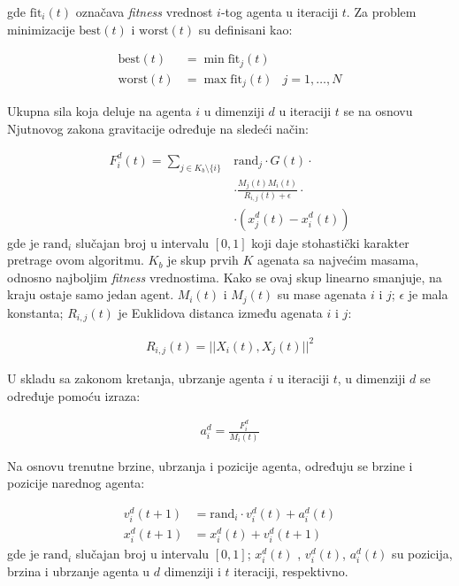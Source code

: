 gde $\mathrm{fit}_i(t)$ označava \emph{fitness} vrednost $i$-tog agenta u iteraciji $t$. Za problem minimizacije $\mathrm{best}(t)$  i $\mathrm{worst}(t)$ su definisani kao:

\begin{align}
    \mathrm{best}(t) & = \min \mathrm{fit}_j(t) & \\
    \mathrm{worst}(t) & = \max \mathrm{fit}_j(t) & j = 1, \dots, N \nonumber
\end{align}

Ukupna sila koja deluje na agenta $i$ u dimenziji $d$ u iteraciji $t$ se na osnovu Njutnovog zakona gravitacije određuje na sledeći način:

\begin{align}
    F_i^d(t) =  \sum_{j \in K_{b} \setminus \{i\}}
    & \mathrm{rand}_j \cdot G(t) \cdot \nonumber \\
    & \cdot \frac{M_j(t) M_i(t)}{R_{i,j}(t) + \epsilon} \cdot \nonumber \\
    & \cdot \left( x_j^d(t) - x_i^d(t) \right)
\end{align}
gde je $\mathrm{rand}_i$ slučajan broj u intervalu $[0,1]$ koji daje stohastički karakter pretrage ovom algoritmu. $K_{b}$ je skup prvih $K$ agenata sa najvećim masama, odnosno najboljim \emph{fitness} vrednostima. Kako se ovaj skup linearno smanjuje, na kraju ostaje samo jedan agent. $M_i(t)$ i $M_j(t)$ su mase agenata $i$ i $j$; $\epsilon$ je mala konstanta; $R_{i,j}(t)$ je Euklidova distanca između agenata $i$ i $j$:

\begin{align*}
    R_{i,j}(t) = ||X_i(t), X_j(t)||^2
\end{align*}

U skladu sa zakonom kretanja, ubrzanje agenta $i$ u iteraciji $t$, u dimenziji $d$ se određuje pomoću izraza:

\begin{align}
    a_i^d = \frac{F_i^d}{M_i(t)}
\end{align}

Na osnovu trenutne brzine, ubrzanja i pozicije agenta, određuju se brzine i pozicije  narednog agenta:

\begin{align}
    v_i^d(t+1) & = \mathrm{rand}_i \cdot v_i^d(t) + a_i^d(t) \\
    x_i^d(t+1) & = x_i^d(t) + v_i^d(t+1)
\end{align}
gde je $\mathrm{rand}_i$ slučajan broj u intervalu $[0,1]$; $x_i^d(t)$ , $v_i^d(t)$, $a_i^d(t)$ su pozicija, brzina i ubrzanje agenta u $d$ dimenziji i $t$ iteraciji, respektivno.

